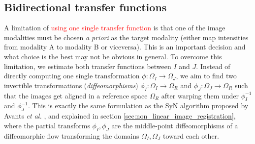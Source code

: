 \subsection{Bidirectional transfer functions}
A limitation of \textcolor{red}{ using one single transfer function } is that one of the image modalities must be chosen \emph{a priori} as the target modality (either map intensities from modality A to modality B or viceversa). This is an important decision and what choice is the best may not be obvious in general. To overcome this limitation, we estimate both transfer functions between $I$ and $J$. Instead of directly computing one single transformation $\phi:\Omega_{I} \rightarrow \Omega_{J}$, we aim to find two invertible transformations (\emph{diffeomorphisms}) $\phi_{I}:\Omega_{I}\rightarrow \Omega_{R}$ and $\phi_{J}:\Omega_{J}\rightarrow \Omega_{R}$ such that the images get aligned in a reference space $\Omega_{R}$ after warping them under $\phi_{I}^{-1}$ and $\phi_{J}^{-1}$. This is exactly the same formulation as the SyN algorithm proposed by Avants {\it et al.} \cite{Avants2011}, and explained in section \ref{sec:non_linear_image_registration}, where the partial transforms $\phi_{I}, \phi_{J}$ are the middle-point diffeomorphisms of a diffeomorphic flow transforming the domains $\Omega_{I}, \Omega_{J}$ toward each other.\\

